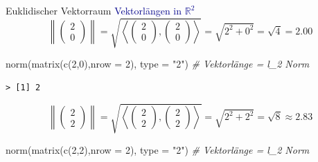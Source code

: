 \documentclass[
  8pt,
  ignorenonframetext,
]{beamer}
\newenvironment{Shaded}{\begin{snugshade}}{\end{snugshade}}
\newcommand{\AttributeTok}[1]{\textcolor[rgb]{0.77,0.63,0.00}{#1}}
\newcommand{\CommentTok}[1]{\textcolor[rgb]{0.56,0.35,0.01}{\textit{#1}}}
\newcommand{\DecValTok}[1]{\textcolor[rgb]{0.00,0.00,0.81}{#1}}
\newcommand{\FunctionTok}[1]{\textcolor[rgb]{0.00,0.00,0.00}{#1}}
\newcommand{\NormalTok}[1]{#1}
\newcommand{\StringTok}[1]{\textcolor[rgb]{0.31,0.60,0.02}{#1}}
\begin{document}
\begin{frame}[fragile]{Euklidischer Vektorraum}
\protect\hypertarget{euklidischer-vektorraum-5}{}
\textcolor{darkblue}{Vektorlängen in $\mathbb{R}^2$} \footnotesize
{} \begin{equation}
\left\lVert \begin{pmatrix} 2 \\ 0 \end{pmatrix} \right\rVert
= \sqrt{\left\langle \begin{pmatrix} 2 \\ 0 \end{pmatrix}, \begin{pmatrix} 2 \\ 0 \end{pmatrix} \right\rangle}
= \sqrt{2^2 + 0^2}
= \sqrt{4}
= 2.00
\end{equation}

\begin{Shaded}
\begin{Highlighting}[]
\FunctionTok{norm}\NormalTok{(}\FunctionTok{matrix}\NormalTok{(}\FunctionTok{c}\NormalTok{(}\DecValTok{2}\NormalTok{,}\DecValTok{0}\NormalTok{),}\AttributeTok{nrow =} \DecValTok{2}\NormalTok{), }\AttributeTok{type =} \StringTok{"2"}\NormalTok{)             }\CommentTok{\# Vektorlänge = l\_2 Norm}
\end{Highlighting}
\end{Shaded}

\begin{verbatim}
> [1] 2
\end{verbatim}

\begin{equation}
\left\lVert \begin{pmatrix} 2 \\ 2 \end{pmatrix} \right\rVert
= \sqrt{\left\langle \begin{pmatrix} 2 \\ 2 \end{pmatrix}, \begin{pmatrix} 2 \\ 2 \end{pmatrix} \right\rangle}
= \sqrt{2^2 + 2^2}
= \sqrt{8}
\approx 2.83
\end{equation}

\begin{Shaded}
\begin{Highlighting}[]
\FunctionTok{norm}\NormalTok{(}\FunctionTok{matrix}\NormalTok{(}\FunctionTok{c}\NormalTok{(}\DecValTok{2}\NormalTok{,}\DecValTok{2}\NormalTok{),}\AttributeTok{nrow =} \DecValTok{2}\NormalTok{), }\AttributeTok{type =} \StringTok{"2"}\NormalTok{)             }\CommentTok{\# Vektorlänge = l\_2 Norm}
\end{Highlighting}
\end{Shaded}


\end{frame}
\end{document}
